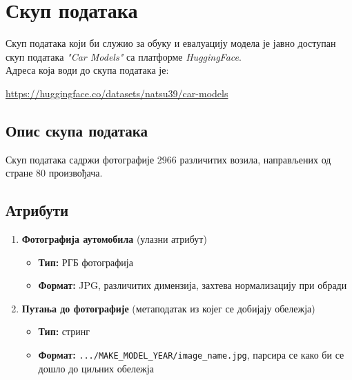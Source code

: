 \documentclass{article}
\begin{document}
  \section{Скуп података}
  Скуп података који би служио за обуку и евалуацију модела је јавно доступан скуп података \emph{"Car Models"} са платформе \textit{HuggingFace}. \\
  Адреса која води до скупа података је: 

  {\centering
    \url{https://huggingface.co/datasets/natsu39/car-models}
  \par}

  \subsection*{Опис скупа података}
  Скуп података садржи фотографије 2966 различитих возила, направљених од стране 80 произвођача.

  \subsection*{Атрибути}
  \begin{enumerate}
    \item \textbf{Фотографија аутомобила} (улазни атрибут)
      \begin{itemize}
        \item \textbf{Тип:} РГБ фотографија
        \item \textbf{Формат:} JPG, различитих димензија, захтева нормализацију при обради
      \end{itemize}
    \item \textbf{Путања до фотографије} (метаподатак из којег се добијају обележја) 
      \begin{itemize}
        \item \textbf{Тип:} стринг
        \item \textbf{Формат:} \verb|.../MAKE_MODEL_YEAR/image_name.jpg|, парсира се како би се дошло до циљних обележја
      \end{itemize}
  \end{enumerate}
\end{document}
